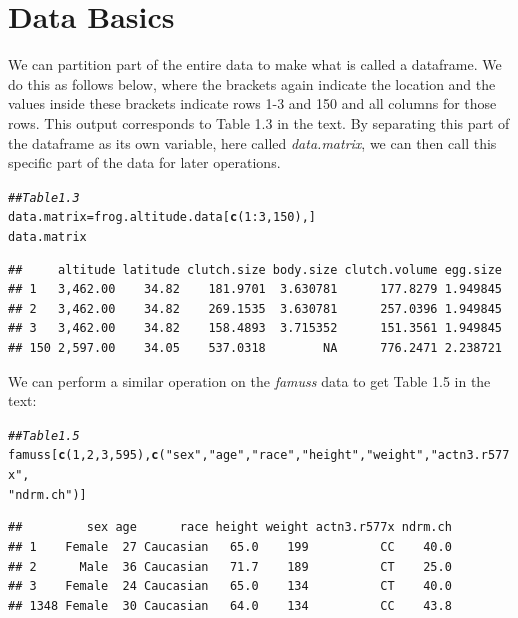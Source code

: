 \documentclass[11pt]{article}\usepackage[]{graphicx}\usepackage[]{color}
\makeatletter
\newcommand{\hlnum}[1]{\textcolor[rgb]{0.686,0.059,0.569}{#1}}%
\newcommand{\hlstr}[1]{\textcolor[rgb]{0.192,0.494,0.8}{#1}}%
\newcommand{\hlcom}[1]{\textcolor[rgb]{0.678,0.584,0.686}{\textit{#1}}}%
\newcommand{\hlopt}[1]{\textcolor[rgb]{0,0,0}{#1}}%
\newcommand{\hlstd}[1]{\textcolor[rgb]{0.345,0.345,0.345}{#1}}%
\newcommand{\hlkwb}[1]{\textcolor[rgb]{0.69,0.353,0.396}{#1}}%
\newcommand{\hlkwd}[1]{\textcolor[rgb]{0.737,0.353,0.396}{\textbf{#1}}}%
\newenvironment{kframe}{%
 \def\at@end@of@kframe{}%
 \ifinner\ifhmode%
  \def\at@end@of@kframe{\end{minipage}}%
  \begin{minipage}{\columnwidth}%
 \fi\fi%
 \def\FrameCommand##1{\hskip\@totalleftmargin \hskip-\fboxsep
 \colorbox{shadecolor}{##1}\hskip-\fboxsep
     \hskip-\linewidth \hskip-\@totalleftmargin \hskip\columnwidth}%
 \MakeFramed {\advance\hsize-\width
   \@totalleftmargin\z@ \linewidth\hsize
   \@setminipage}}%
 {\par\unskip\endMakeFramed%
 \at@end@of@kframe}
\newenvironment{knitrout}{}{} %
\makeatother
\begin{document}
\section{Data Basics}
We can partition part of the entire data to make what is called a dataframe.  We do this as follows below, where the brackets again indicate the location and the values inside these brackets indicate rows 1-3 and 150 and all columns for those rows.  This output corresponds to Table 1.3 in the text.  By separating this part of the dataframe as its own variable, here called \textit{data.matrix}, we can then call this specific part of the data for later operations.
\begin{knitrout}
\color{fgcolor}\begin{kframe}
\begin{alltt}
\hlcom{## Table 1.3}
\hlstd{data.matrix} \hlkwb{=} \hlstd{frog.altitude.data[}\hlkwd{c}\hlstd{(}\hlnum{1}\hlopt{:}\hlnum{3}\hlstd{,} \hlnum{150}\hlstd{),]}
\hlstd{data.matrix}
\end{alltt}
\begin{verbatim}
##     altitude latitude clutch.size body.size clutch.volume egg.size
## 1   3,462.00    34.82    181.9701  3.630781      177.8279 1.949845
## 2   3,462.00    34.82    269.1535  3.630781      257.0396 1.949845
## 3   3,462.00    34.82    158.4893  3.715352      151.3561 1.949845
## 150 2,597.00    34.05    537.0318        NA      776.2471 2.238721
\end{verbatim}
\end{kframe}
\end{knitrout}
We can perform a similar operation on the \textit{famuss} data to get Table 1.5 in the text:
\begin{knitrout}
\color{fgcolor}\begin{kframe}
\begin{alltt}
\hlcom{## Table 1.5}
\hlstd{famuss[}\hlkwd{c}\hlstd{(}\hlnum{1}\hlstd{,}\hlnum{2}\hlstd{,}\hlnum{3}\hlstd{,}\hlnum{595}\hlstd{),}\hlkwd{c}\hlstd{(} \hlstr{"sex"}\hlstd{,} \hlstr{"age"}\hlstd{,} \hlstr{"race"}\hlstd{,} \hlstr{"height"}\hlstd{,} \hlstr{"weight"}\hlstd{,} \hlstr{"actn3.r577x"}\hlstd{,}
                       \hlstr{"ndrm.ch"}\hlstd{)]}
\end{alltt}
\begin{verbatim}
##         sex age      race height weight actn3.r577x ndrm.ch
## 1    Female  27 Caucasian   65.0    199          CC    40.0
## 2      Male  36 Caucasian   71.7    189          CT    25.0
## 3    Female  24 Caucasian   65.0    134          CT    40.0
## 1348 Female  30 Caucasian   64.0    134          CC    43.8
\end{verbatim}
\end{kframe}
\end{knitrout}
\end{document}
